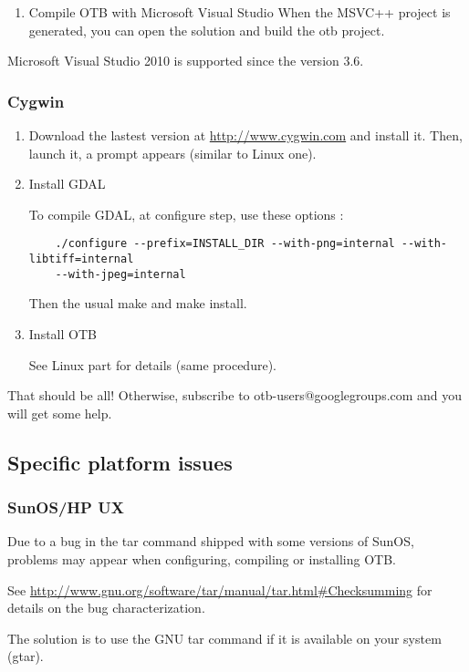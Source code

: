 \begin{enumerate}
\item Compile OTB with Microsoft Visual Studio
  When the MSVC++ project is generated, you can open the solution and build the otb project.

\end{enumerate}

Microsoft Visual Studio 2010 is supported since the version 3.6. 

\subsubsection{Cygwin}
\begin{enumerate}

\item Download the lastest version at \url{http://www.cygwin.com} and install it.
	Then, launch it, a prompt appears (similar to Linux one).

\item Install GDAL

	To compile GDAL, at configure step, use these options :
\begin{verbatim}
	./configure --prefix=INSTALL_DIR --with-png=internal --with-libtiff=internal
	--with-jpeg=internal
\end{verbatim}
	Then the usual make and make install.


\item Install OTB

	See Linux part for details (same procedure).
\end{enumerate}

That should be all! Otherwise, subscribe to
   otb-users@googlegroups.com and you will get some help.

\subsection{Specific platform issues}
\subsubsection{SunOS/HP UX}
Due to a bug in the tar command shipped with some versions of SunOS,
problems may appear when configuring, compiling or installing OTB.

See \url{http://www.gnu.org/software/tar/manual/tar.html#Checksumming} for
details on the bug characterization.

The solution is to use the GNU tar command if it is available on your
system (gtar).

